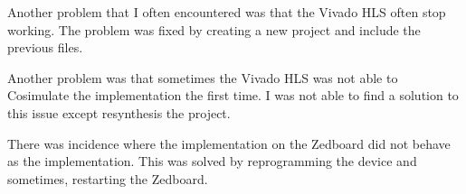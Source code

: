 Another problem that I often encountered was that the Vivado HLS often stop working. The problem was fixed by creating a new project and include the previous files.

Another problem was that sometimes the Vivado HLS was not able to Cosimulate the implementation the first time. I was not able to find a solution to this issue except resynthesis the project. 

There was incidence where the implementation on the Zedboard did not behave as the implementation. This was solved by reprogramming the device and sometimes, restarting the Zedboard.

